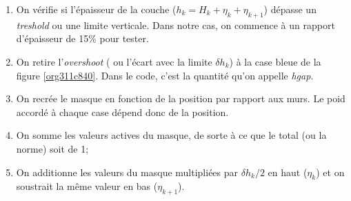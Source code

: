 \documentclass[10pt]{article}
\numberwithin{equation}{section}
\begin{document}
\begin{enumerate}
\item On vérifie si l'épaisseur de la couche (\(h_k = H_k + \eta_k + \eta_{k+1}\)) dépasse un \emph{treshold} ou une limite verticale.
Dans notre cas, on commence à un rapport d'épaisseur de 15\% pour tester.
\item On retire l'\emph{overshoot} ( ou l'écart avec la limite \(\delta h_k\)) à la case bleue de la figure \ref{org311c840}.
Dans le code, c'est la quantité qu'on appelle \emph{hgap}.
\item On recrée le masque en fonction de la position par rapport aux murs.
Le poid accordé à chaque case dépend donc de la position.
\item On somme les valeurs actives du masque, de sorte à ce que le total (ou la norme) soit de 1;
\item On additionne les valeurs du masque multipliées par \(\delta h_k/2\) en haut (\(\eta_k\)) et on soustrait la même valeur en bas (\(\eta_{k+1}\)).
\end{enumerate}
\end{document}
